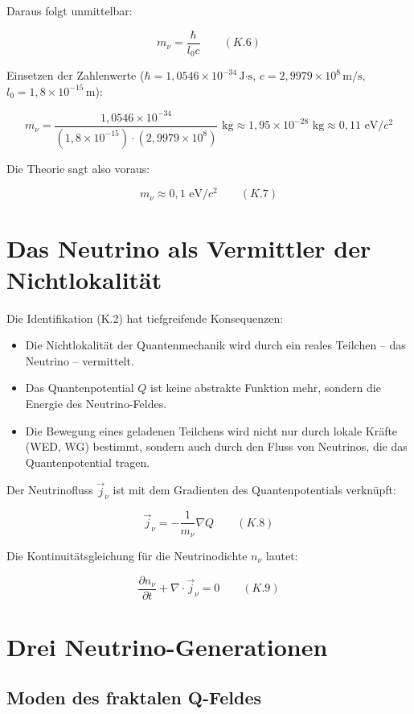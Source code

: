Daraus folgt unmittelbar:

\[
m_{\nu} = \frac{\hbar}{l_0 c} \qquad (K.6)
\]

Einsetzen der Zahlenwerte ($\hbar = 1,0546 \times 10^{-34}\,\text{J·s}$, 
$c = 2,9979 \times 10^8\,\text{m/s}$, $l_0 = 1,8 \times 10^{-15}\,\text{m}$):

\[
m_{\nu} = \frac{1,0546 \times 10^{-34}}{(1,8 \times 10^{-15}) \cdot (2,9979 \times 10^8)} \text{ kg}
        \approx 1,95 \times 10^{-28} \text{ kg} \approx 0,11 \text{ eV}/c^2
\]

Die Theorie sagt also voraus:

\[
m_{\nu} \approx 0,1 \text{ eV}/c^2 \qquad (K.7)
\]

\section{Das Neutrino als Vermittler der Nichtlokalität}

Die Identifikation (K.2) hat tiefgreifende Konsequenzen:
\begin{itemize}
    \item Die Nichtlokalität der Quantenmechanik wird durch ein reales Teilchen – 
          das Neutrino – vermittelt.
    \item Das Quantenpotential $Q$ ist keine abstrakte Funktion mehr, sondern die 
          Energie des Neutrino-Feldes.
    \item Die Bewegung eines geladenen Teilchens wird nicht nur durch lokale Kräfte 
          (WED, WG) bestimmt, sondern auch durch den Fluss von Neutrinos, die das 
          Quantenpotential tragen.
\end{itemize}

Der Neutrinofluss $\vec{j}_{\nu}$ ist mit dem Gradienten des Quantenpotentials verknüpft:

\[
\vec{j}_{\nu} = -\frac{1}{m_{\nu}} \nabla Q \qquad (K.8)
\]

Die Kontinuitätsgleichung für die Neutrinodichte $n_{\nu}$ lautet:

\[
\frac{\partial n_{\nu}}{\partial t} + \nabla \cdot \vec{j}_{\nu} = 0 \qquad (K.9)
\]

\section{Drei Neutrino-Generationen}

\subsection{Moden des fraktalen Q-Feldes}

